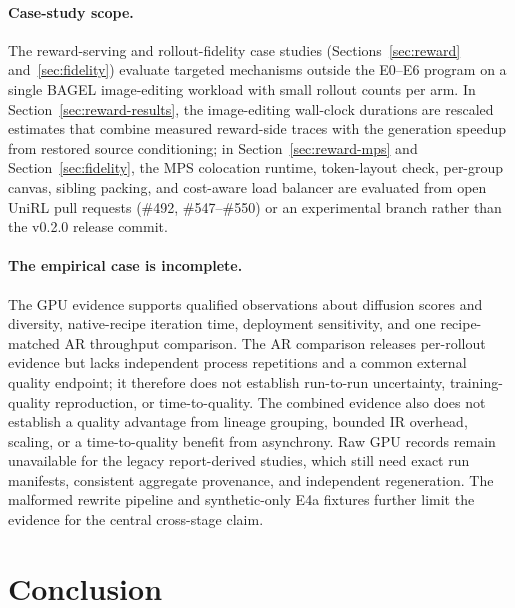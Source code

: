 \documentclass[10pt]{article}
\begin{document}
\paragraph{Case-study scope.}
The reward-serving and rollout-fidelity case studies (Sections~\ref{sec:reward} and~\ref{sec:fidelity}) evaluate targeted mechanisms outside the E0--E6 program on a single BAGEL image-editing workload with small rollout counts per arm.
In Section~\ref{sec:reward-results}, the image-editing wall-clock durations are rescaled estimates that combine measured reward-side traces with the generation speedup from restored source conditioning; in Section~\ref{sec:reward-mps} and Section~\ref{sec:fidelity}, the MPS colocation runtime, token-layout check, per-group canvas, sibling packing, and cost-aware load balancer are evaluated from open UniRL pull requests (\#492, \#547--\#550) or an experimental branch rather than the v0.2.0 release commit.

\paragraph{The empirical case is incomplete.}
The GPU evidence supports qualified observations about diffusion scores and diversity, native-recipe iteration time, deployment sensitivity, and one recipe-matched AR throughput comparison.
The AR comparison releases per-rollout evidence but lacks independent process repetitions and a common external quality endpoint; it therefore does not establish run-to-run uncertainty, training-quality reproduction, or time-to-quality.
The combined evidence also does not establish a quality advantage from lineage grouping, bounded IR overhead, scaling, or a time-to-quality benefit from asynchrony.
Raw GPU records remain unavailable for the legacy report-derived studies, which still need exact run manifests, consistent aggregate provenance, and independent regeneration.
The malformed rewrite pipeline and synthetic-only E4a fixtures further limit the evidence for the central cross-stage claim.

\section{Conclusion}
\label{sec:conclusion}
\end{document}
